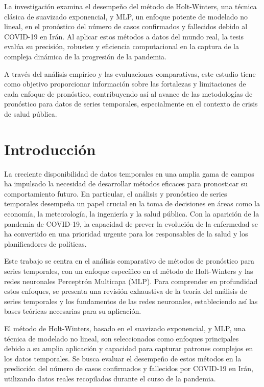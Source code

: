 \documentclass[
  us-letterpaper,
]{scrreprt}
\theoremstyle{plain}
\theoremstyle{definition}
\theoremstyle{plain}
\theoremstyle{definition}
\theoremstyle{remark}
\begin{document}
La investigación examina el desempeño del método de Holt-Winters, una
técnica clásica de suavizado exponencial, y MLP, un enfoque potente de
modelado no lineal, en el pronóstico del número de casos confirmados y
fallecidos debido al COVID-19 en Irán. Al aplicar estos métodos a datos
del mundo real, la tesis evalúa su precisión, robustez y eficiencia
computacional en la captura de la compleja dinámica de la progresión de
la pandemia.

A través del análisis empírico y las evaluaciones comparativas, este
estudio tiene como objetivo proporcionar información sobre las
fortalezas y limitaciones de cada enfoque de pronóstico, contribuyendo
así al avance de las metodologías de pronóstico para datos de series
temporales, especialmente en el contexto de crisis de salud pública.


\chapter*{Introducción}\label{introducciuxf3n}


La creciente disponibilidad de datos temporales en una amplia gama de
campos ha impulsado la necesidad de desarrollar métodos eficaces para
pronosticar su comportamiento futuro. En particular, el análisis y
pronóstico de series temporales desempeña un papel crucial en la toma de
decisiones en áreas como la economía, la meteorología, la ingeniería y
la salud pública. Con la aparición de la pandemia de COVID-19, la
capacidad de prever la evolución de la enfermedad se ha convertido en
una prioridad urgente para los responsables de la salud y los
planificadores de políticas.

Este trabajo se centra en el análisis comparativo de métodos de
pronóstico para series temporales, con un enfoque específico en el
método de Holt-Winters y las redes neuronales Perceptrón Multicapa
(MLP). Para comprender en profundidad estos enfoques, se presenta una
revisión exhaustiva de la teoría del análisis de series temporales y los
fundamentos de las redes neuronales, estableciendo así las bases
teóricas necesarias para su aplicación.

El método de Holt-Winters, basado en el suavizado exponencial, y MLP,
una técnica de modelado no lineal, son seleccionados como enfoques
principales debido a su amplia aplicación y capacidad para capturar
patrones complejos en los datos temporales. Se busca evaluar el
desempeño de estos métodos en la predicción del número de casos
confirmados y fallecidos por COVID-19 en Irán, utilizando datos reales
recopilados durante el curso de la pandemia.
\end{document}
